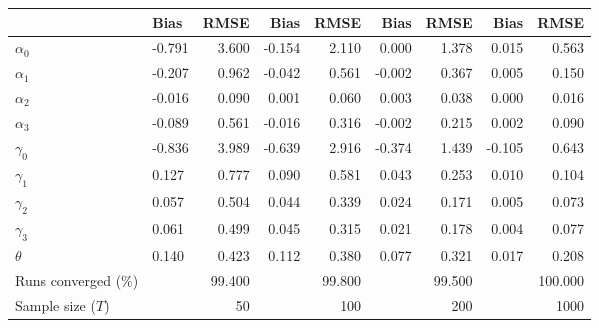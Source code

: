 
\begin{tabular}[t]{llrrrrrrr}
\toprule
  & Bias & RMSE & Bias & RMSE & Bias & RMSE & Bias & RMSE\\
\midrule
$\alpha_{0}$ & -0.791 & 3.600 & -0.154 & 2.110 & 0.000 & 1.378 & 0.015 & 0.563\\
$\alpha_{1}$ & -0.207 & 0.962 & -0.042 & 0.561 & -0.002 & 0.367 & 0.005 & 0.150\\
$\alpha_{2}$ & -0.016 & 0.090 & 0.001 & 0.060 & 0.003 & 0.038 & 0.000 & 0.016\\
$\alpha_{3}$ & -0.089 & 0.561 & -0.016 & 0.316 & -0.002 & 0.215 & 0.002 & 0.090\\
$\gamma_{0}$ & -0.836 & 3.989 & -0.639 & 2.916 & -0.374 & 1.439 & -0.105 & 0.643\\
$\gamma_{1}$ & 0.127 & 0.777 & 0.090 & 0.581 & 0.043 & 0.253 & 0.010 & 0.104\\
$\gamma_{2}$ & 0.057 & 0.504 & 0.044 & 0.339 & 0.024 & 0.171 & 0.005 & 0.073\\
$\gamma_{3}$ & 0.061 & 0.499 & 0.045 & 0.315 & 0.021 & 0.178 & 0.004 & 0.077\\
$\theta$ & 0.140 & 0.423 & 0.112 & 0.380 & 0.077 & 0.321 & 0.017 & 0.208\\
Runs converged (\%) &  & 99.400 &  & 99.800 &  & 99.500 &  & 100.000\\
Sample size ($T$) &  & 50 &  & 100 &  & 200 &  & 1000\\
\bottomrule
\end{tabular}
